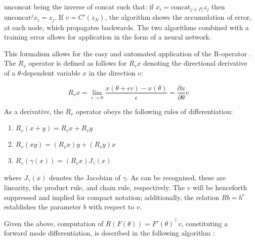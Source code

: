 \begin{algorithmic}[1]
    \EndFor
    \EndFor
\end{algorithmic}

\noindent
$\text{unconcat}$ being the inverse of $\text{concat}$ such that: if $x_i = \text{concat}_{j\in P_i} z_j$ then $\text{unconcat}^j x_i = z_j$. If $v = C'(z_N)$, the algorithm shows the accumulation of error, at each node, which propagates backwards. The two algorithms combined with a training error allows for application in the form of a neural network. 

This formalism allows for the easy and automated application of the R-operator \cite{pepe}. The $R_v$ operator is defined as follows for $R_vx $ denoting the directional derivative of a $\theta$-dependent variable $x$ in the direction $v$:

\[R_vx = \lim_{\epsilon\to 0} \frac{x(\theta + \epsilon v) - x(\theta)}{\epsilon} = \frac{\partial x}{\partial\theta}v\]

\noindent
As a derivative, the $R_v$ operator obeys the following rules of differentiation:

\begin{enumerate}
    \item $R_v(x+y) = R_vx + R_vy$
    \item $ R_v(xy) = (R_vx)y + (R_vy)x $
    \item $R_v(\gamma(x)) = (R_vx) J_{\gamma}(x)$
\end{enumerate}

\noindent
where $J_\gamma(x)$ denotes the Jacobian of $\gamma$. As can be recognized, these are linearity, the product rule, and chain rule, respectively. The $v$ will be henceforth suppressed and implied for compact notation; additionally, the relation $Rb = b^v$ establishes the parameter $b$ with respect to $v$.

Given the above, computation of $R(F(\theta)) = F'(\theta)^\intercal v$, constituting a forward mode differentiation, is described in the following algorithm \cite{suts}:

\begin{algorithmic}[1]
    \EndFor
\end{algorithmic}

